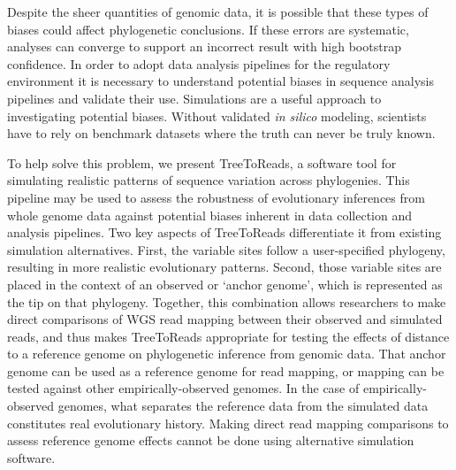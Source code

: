 \documentclass{bmcart}
\begin{document}
Despite the sheer quantities of genomic data, it is possible that these types of biases could affect phylogenetic conclusions.
If these errors are systematic, analyses can converge to support an incorrect result with high bootstrap confidence.
In order to adopt data analysis pipelines for the regulatory environment it is necessary to understand potential biases in sequence analysis pipelines and validate their use.
Simulations are a useful approach to investigating potential biases. 
Without validated \emph{in silico} modeling, scientists have to rely on benchmark datasets where the truth can never be truly known.

To help solve this problem, we present TreeToReads, a software tool for simulating realistic patterns of sequence variation across phylogenies.
This pipeline may be used to assess the robustness of evolutionary inferences from whole genome data against potential biases inherent in data collection and analysis pipelines.
Two key aspects of TreeToReads differentiate it from existing simulation alternatives.
First, the variable sites follow a user-specified phylogeny, resulting in more realistic evolutionary patterns.
Second, those variable sites are placed in the context of an observed or `anchor genome', which is represented as the tip on that phylogeny.
Together, this combination allows researchers to make direct comparisons of WGS read mapping between their observed and simulated reads, 
and thus makes TreeToReads appropriate for testing the effects of distance to a reference genome on phylogenetic inference from genomic data.
That anchor genome can be used as a reference genome for read mapping, or mapping can be tested against other empirically-observed genomes.
In the case of empirically-observed genomes, what separates the reference data from the simulated data constitutes real evolutionary history.
Making direct read mapping comparisons to assess reference genome effects cannot be done using alternative simulation software.
\end{document}
